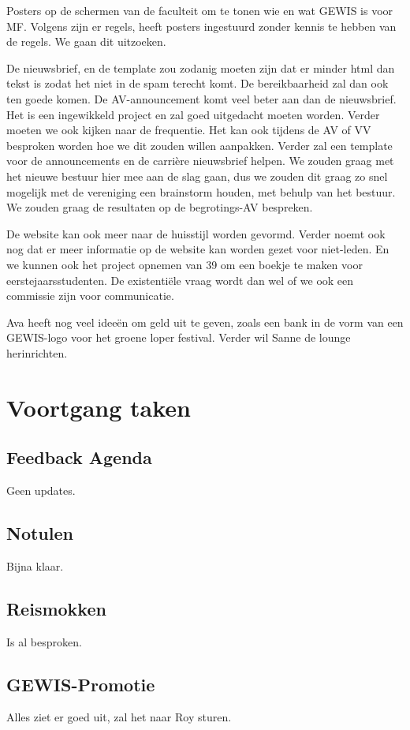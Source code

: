 \documentclass[
dutch
]{GEWISMinutes}
\begin{document}
	Posters op de schermen van de faculteit om te tonen wie en wat GEWIS is voor MF. Volgens \rink zijn er regels, \nicky heeft posters ingestuurd zonder kennis te hebben van de regels. We gaan dit uitzoeken.
	
	De nieuwsbrief, en de template zou zodanig moeten zijn dat er minder html dan tekst is zodat het niet in de spam terecht komt. De bereikbaarheid zal dan ook ten goede komen. De AV-announcement komt veel beter aan dan de nieuwsbrief. Het is een ingewikkeld project en zal goed uitgedacht moeten worden. Verder moeten we ook kijken naar de frequentie. Het kan ook tijdens de AV of VV besproken worden hoe we dit zouden willen aanpakken. Verder zal een template voor de announcements en de carri\`ere nieuwsbrief helpen. We zouden graag met het nieuwe bestuur hier mee aan de slag gaan, dus we zouden dit graag zo snel mogelijk met de vereniging een brainstorm houden, met behulp van het bestuur. We zouden graag de resultaten op de begrotings-AV bespreken. 
	
	De website kan ook meer naar de huisstijl worden gevormd. Verder noemt \ava ook nog dat er meer informatie op de website kan worden gezet voor niet-leden. En we kunnen ook het project opnemen van 39 om een boekje te maken voor eerstejaarsstudenten. De existenti\"ele vraag wordt dan wel of we ook een commissie zijn voor communicatie. 
	
	Ava heeft nog veel idee\"en om geld uit te geven, zoals een bank in de vorm van een GEWIS-logo voor het groene loper festival. Verder wil Sanne de lounge herinrichten.
	
	\section{Voortgang taken}
	
	\subsection{Feedback Agenda}
	Geen updates.
	
	\subsection{Notulen}
	Bijna klaar.
	
	\subsection{Reismokken}
	Is al besproken.
	
	\subsection{GEWIS-Promotie}
	Alles ziet er goed uit, \ava zal het naar Roy sturen.
	
\end{document}
